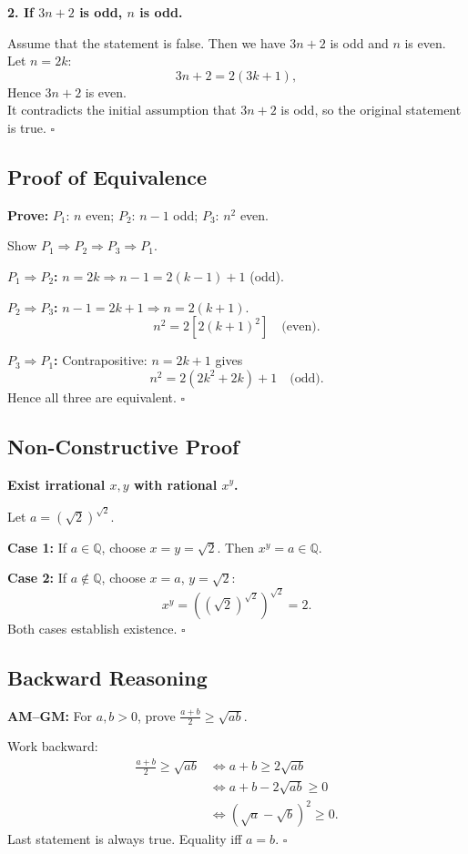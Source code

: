 \textbf{2. If $3n+2$ is odd, $n$ is odd.}

Assume that the statement is false.
Then we have $3n+2$ is odd and $n$ is even.
Let $n=2k$:
\[
3n+2=2(3k+1),
\]
Hence $3n + 2$ is even. \\
It contradicts the initial assumption that $3n + 2$ is odd, so the original statement is true.
$\square$

\subsection{Proof of Equivalence}

\textbf{Prove:}
$P_1$: $n$ even;
$P_2$: $n-1$ odd;
$P_3$: $n^2$ even.

Show $P_1\Rightarrow P_2\Rightarrow P_3
\Rightarrow P_1$.

\textbf{$P_1\Rightarrow P_2$:}
$n=2k\Rightarrow n-1=2(k-1)+1$ (odd).

\textbf{$P_2\Rightarrow P_3$:}
$n-1=2k+1\Rightarrow n=2(k+1)$.
\[
n^2=2[2(k+1)^2]\quad\text{(even)}.
\]

\textbf{$P_3\Rightarrow P_1$:}
Contrapositive: $n=2k+1$ gives
\[
n^2=2(2k^2+2k)+1\quad\text{(odd)}.
\]
Hence all three are equivalent. $\square$

\subsection{Non-Constructive Proof}

\textbf{Exist irrational $x,y$ with rational $x^y$.}

Let $a=(\sqrt2)^{\sqrt2}$.

\textbf{Case 1:} If $a\in\mathbb Q$, choose
$x=y=\sqrt2$. Then $x^y=a\in\mathbb Q$.

\textbf{Case 2:} If $a\notin\mathbb Q$, choose
$x=a$, $y=\sqrt2$:
\[
x^y=((\sqrt2)^{\sqrt2})^{\sqrt2}=2.
\]
Both cases establish existence. $\square$

\subsection{Backward Reasoning}

\textbf{AM--GM:} For $a,b>0$, prove
$\frac{a+b}{2}\geq\sqrt{ab}$.

Work backward:
\[
\begin{aligned}
\frac{a+b}{2}\geq\sqrt{ab}
&\iff a+b\geq2\sqrt{ab}\\
&\iff a+b-2\sqrt{ab}\geq0\\
&\iff(\sqrt a-\sqrt b)^2\geq0.
\end{aligned}
\]
Last statement is always true.
Equality iff $a=b$. $\square$

\endgroup
